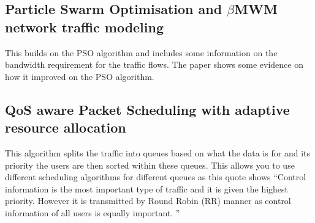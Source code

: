 {	\subsection{Particle Swarm Optimisation and $\beta$MWM network traffic modeling \cite{DRASwarmWthNetwork7250422}}
	{
		This builds on the PSO algorithm and includes some information on the bandwidth requirement for the traffic flows. The paper shows some evidence on how it improved on the PSO algorithm.

	}

	\subsection{QoS aware Packet Scheduling with adaptive resource allocation \cite{DRAPacketScheduling6192856}}
	{
		This algorithm splits the traffic into queues based on what the data is for and its priority the users are then sorted within these queues. This allows you to use different scheduling algorithms for different queues as this quote shows \enquote{Control information is the most important type of traffic and it is given the highest priority. However it is transmitted by Round Robin (RR) manner as control information of all users is equally important. \cite{DRAPacketScheduling6192856}}
	}
}